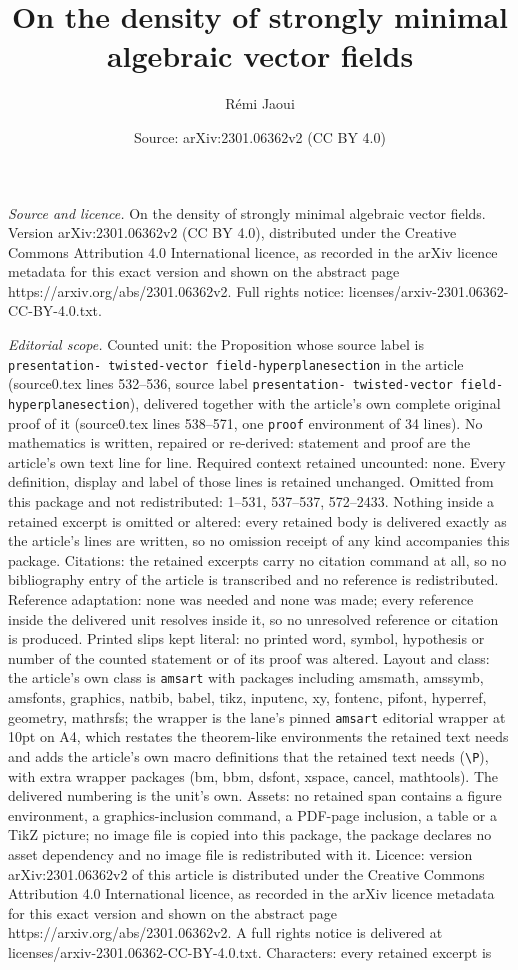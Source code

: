 \documentclass[10pt,a4paper]{amsart}
\title[On the density of strongly minimal algebraic vector fields]{On the density of strongly minimal algebraic vector fields}
\author{R\'emi Jaoui}
\date{Source: arXiv:2301.06362v2 (CC BY 4.0)}
\begin{document}
\maketitle

\noindent\emph{Source and licence.} On the density of strongly minimal algebraic vector fields. Version arXiv:2301.06362v2 (CC BY 4.0), distributed under the Creative Commons Attribution 4.0 International licence, as recorded in the arXiv licence metadata for this exact version and shown on the abstract page https://arxiv.org/abs/2301.06362v2. Full rights notice: licenses/arxiv-2301.06362-CC-BY-4.0.txt.\par\smallskip

\noindent\textit{Editorial scope.} Counted unit: the Proposition whose source label is \texttt{presentation- twisted-vector field-hyperplanesection} in the article (source0.tex lines 532--536, source label \texttt{presentation- twisted-vector field-hyperplanesection}), delivered together with the article's own complete original proof of it (source0.tex lines 538--571, one \texttt{proof} environment of 34 lines). No mathematics is written, repaired or re-derived: statement and proof are the article's own text line for line. Required context retained uncounted: none. Every definition, display and label of those lines is retained unchanged. Omitted from this package and not redistributed: 1--531, 537--537, 572--2433. Nothing inside a retained excerpt is omitted or altered: every retained body is delivered exactly as the article's lines are written, so no omission receipt of any kind accompanies this package. Citations: the retained excerpts carry no citation command at all, so no bibliography entry of the article is transcribed and no reference is redistributed. Reference adaptation: none was needed and none was made; every reference inside the delivered unit resolves inside it, so no unresolved reference or citation is produced. Printed slips kept literal: no printed word, symbol, hypothesis or number of the counted statement or of its proof was altered. Layout and class: the article's own class is \texttt{amsart} with packages including amsmath, amssymb, amsfonts, graphics, natbib, babel, tikz, inputenc, xy, fontenc, pifont, hyperref, geometry, mathrsfs; the wrapper is the lane's pinned \texttt{amsart} editorial wrapper at 10pt on A4, which restates the theorem-like environments the retained text needs and adds the article's own macro definitions that the retained text needs (\texttt{\textbackslash P}), with extra wrapper packages (bm, bbm, dsfont, xspace, cancel, mathtools). The delivered numbering is the unit's own. Assets: no retained span contains a figure environment, a graphics-inclusion command, a PDF-page inclusion, a table or a TikZ picture; no image file is copied into this package, the package declares no asset dependency and no image file is redistributed with it. Licence: version arXiv:2301.06362v2 of this article is distributed under the Creative Commons Attribution 4.0 International licence, as recorded in the arXiv licence metadata for this exact version and shown on the abstract page https://arxiv.org/abs/2301.06362v2. A full rights notice is delivered at licenses/arxiv-2301.06362-CC-BY-4.0.txt. Characters: every retained excerpt is 
\end{document}
